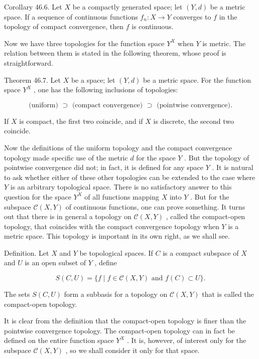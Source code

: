 \documentclass[10pt]{article}
\begin{document}
Corollary 46.6. Let \(X\) be a compactly generated space; let \(\left( {Y,d}\right)\) be a metric space. If a sequence of continuous functions \({f}_{n} : X \rightarrow  Y\) converges to \(f\) in the topology of compact convergence, then \(f\) is continuous.

Now we have three topologies for the function space \({Y}^{X}\) when \(Y\) is metric. The relation between them is stated in the following theorem, whose proof is straightforward.

Theorem 46.7. Let \(X\) be a space; let \(\left( {Y,d}\right)\) be a metric space. For the function space \({Y}^{X}\) , one has the following inclusions of topologies:

\[
\text{ (uniform) } \supset  \text{ (compact convergence) } \supset  \text{ (pointwise convergence). }
\]

If \(X\) is compact, the first two coincide, and if \(X\) is discrete, the second two coincide.

Now the definitions of the uniform topology and the compact convergence topology made specific use of the metric \(d\) for the space \(Y\) . But the topology of pointwise convergence did not; in fact, it is defined for any space \(Y\) . It is natural to ask whether either of these other topologies can be extended to the case where \(Y\) is an arbitrary topological space. There is no satisfactory answer to this question for the space \({Y}^{X}\) of all functions mapping \(X\) into \(Y\) . But for the subspace \(\mathcal{C}\left( {X,Y}\right)\) of continuous functions, one can prove something. It turns out that there is in general a topology on \(\mathcal{C}\left( {X,Y}\right)\) , called the compact-open topology, that coincides with the compact convergence topology when \(Y\) is a metric space. This topology is important in its own right, as we shall see.

Definition. Let \(X\) and \(Y\) be topological spaces. If \(C\) is a compact subspace of \(X\) and \(U\) is an open subset of \(Y\) , define

\[
S\left( {C,U}\right)  = \{ f \mid  f \in  \mathcal{C}\left( {X,Y}\right) \text{ and }f\left( C\right)  \subset  U\} .
\]

The sets \(S\left( {C,U}\right)\) form a subbasis for a topology on \(\mathcal{C}\left( {X,Y}\right)\) that is called the compact-open topology.

It is clear from the definition that the compact-open topology is finer than the pointwise convergence topology. The compact-open topology can in fact be defined on the entire function space \({Y}^{X}\) . It is, however, of interest only for the subspace \(\mathcal{C}\left( {X,Y}\right)\) , so we shall consider it only for that space.
\end{document}
